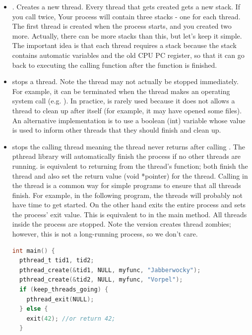 \begin{itemize}
\item {}.
Creates a new thread.
Every thread that gets created gets a new stack.
If you call  twice, Your process will contain three stacks - one for each thread.
The first thread is created when the process starts, and you created two more.
Actually, there can be more stacks than this, but let's keep it simple.
The important idea is that each thread requires a stack because the stack contains automatic variables and the old CPU PC register, so that it can go back to executing the calling function after the function is finished.

\item {} stops a thread.
Note the thread may not actually be stopped immediately.
For example, it can be terminated when the thread makes an operating system call (e.g. ).
In practice,  is rarely used because it does not allows a thread to clean up after itself (for example, it may have opened some files).
An alternative implementation is to use a boolean (int) variable whose value is used to inform other threads that they should finish and clean up.

\item {} stops the calling thread meaning the thread never returns after calling .
The pthread library will automatically finish the process if no other threads are running.
 is equivalent to returning from the thread's function; both finish the thread and also set the return value (void *pointer) for the thread.
Calling  in the  thread is a common way for simple programs to ensure that all threads finish.
For example, in the following program, the  threads will probably not have time to get started.
On the other hand  exits the entire process and sets the process' exit value.
This is equivalent to  in the main method.
All threads inside the process are stopped.
Note the  version creates thread zombies; however, this is not a long-running process, so we don't care.

\begin{lstlisting}[language=C]
int main() {
  pthread_t tid1, tid2;
  pthread_create(&tid1, NULL, myfunc, "Jabberwocky");
  pthread_create(&tid2, NULL, myfunc, "Vorpel");
  if (keep_threads_going) {
    pthread_exit(NULL);
  } else {
    exit(42); //or return 42;
  }


\end{lstlisting}
\end{itemize}
